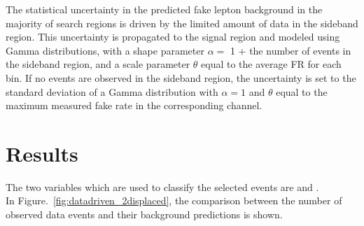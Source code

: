 The statistical uncertainty in the predicted fake lepton background
in the majority of search regions is driven by the limited
amount of data in the sideband region. This uncertainty
is propagated to the signal region and modeled using
Gamma distributions, with a shape parameter $\alpha =$ 1 +  the
number of events in the sideband region, and a scale parameter $\theta$ equal
to the average FR for each bin.
If no events are observed in the sideband region, the uncertainty is
set to the standard deviation of a Gamma distribution with $\alpha =
1$ and $\theta$ equal to the maximum measured fake rate in the
corresponding channel. 

\clearpage
\section{Results}\label{sec:llresults}
The two variables which are used to classify the selected events are \Deltwod and
\mtwol.\\
In Figure.~\ref{fig:datadriven_2displaced},
the comparison between the number of observed data events and their background
predictions is shown.


